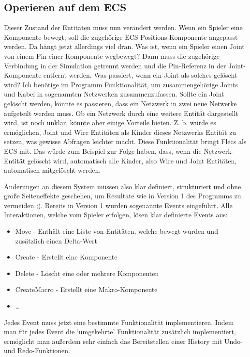 \documentclass{article}
\begin{document}
    \subsection{Operieren auf dem ECS}
    Dieser Zustand der Entitäten muss nun verändert werden.
    Wenn ein Spieler eine Komponente bewegt, soll die zugehörige ECS Positions-Komponente
    angepasst werden.
    Da hängt jetzt allerdings viel dran.
    Was ist, wenn ein Spieler einen Joint von einem Pin einer Komponente wegbewegt?
    Dann muss die zugehörige Verbindung in der Simulation getrennt werden und die Pin-Referenz in der Joint-Komponente entfernt werden.
    Was passiert, wenn ein Joint als solches gelöscht wird?
    Ich benötige im Programm Funktionalität, um zusammengehörige Joints und Kabel in sogenannten
    Netzwerken zusammenzufassen.
    Sollte ein Joint gelöscht werden, könnte es passieren, dass ein Netzwerk in zwei neue Netwerke aufgeteilt werden muss.
    Ob ein Netzwerk durch eine weitere Entität dargestellt wird, ist noch unklar, könnte aber einige Vorteile bieten.
    Z. b. würde es ermöglichen,
    Joint und Wire Entitäten als Kinder dieses Netzwerks Entität zu setzen, was gewisse Abfragen leichter macht.
    Diese Funktionalität bringt Flecs als
    ECS mit.
    Das würde zum Beispiel zur Folge haben, dass, wenn die Netzwerk-Entität gelöscht wird, automatisch alle Kinder, also Wire und Joint Entitäten,
    automatisch mitgelöscht werden.

    Änderungen an diesem System müssen also klar definiert, strukturiert und ohne große Seiteneffekte geschehen, um Resultate wie in Version 1 des
    Programms zu vermeiden ;).
    Bereits in Version 1 wurden sogenannte Events eingeführt.
    Alle Interaktionen, welche vom Spieler erfolgen, lösen klar definierte Events aus:
    \begin{itemize}
        \item Move - Enthält eine Liste von Entitäten, welche bewegt wurden und zusätzlich einen Delta-Wert
        \item Create - Erstellt eine Komponente
        \item Delete - Löscht eine oder mehrere Komponenten
        \item CreateMacro - Erstellt eine Makro-Komponente
        \item \dots
    \end{itemize}
    Jedes Event muss jetzt eine bestimmte Funktionalität implementieren.
    Indem man für jedes Event die `umgekehrte' Funktionalität zusätzlich implementiert,
    ermöglicht man außerdem sehr einfach das Bereitstellen einer History mit Undo- und Redo-Funktionen.
\end{document}

